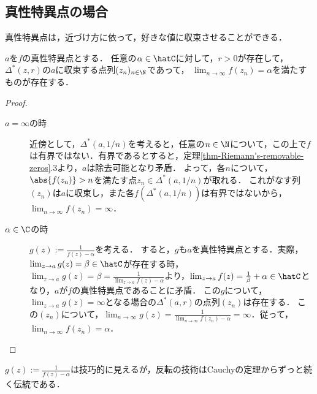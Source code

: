 \documentclass[uplatex, dvipdfmx]{jsreport}
\begin{document}
\subsection{真性特異点の場合}

\begin{screen}
    真性特異点は，近づけ方に依って，好きな値に収束させることができる．
\end{screen}

\begin{theorem}
    $a$を$f$の真性特異点とする．
    任意の$\alpha\in\hatC$に対して，$r>0$が存在して，
    $\Delta^*(z,r)$の$a$に収束する点列$(z_n)_{n\in\N}$であって，
    $\lim_{n\to\infty}f(z_n)=\alpha$を満たすものが存在する．
\end{theorem}
\begin{proof}
    \begin{description}
        \item[$a=\infty$の時] 
        近傍として，$\Delta^*(a,1/n)$を考えると，任意の$n\in\N$について，この上で$f$は有界ではない．有界であるとすると，定理\ref{thm-Riemann's-removable-zeros}.3より，$a$は除去可能となり矛盾．
        よって，各$n$について，$\abs{f(z_n)}>n$を満たす点$z_n\in\Delta^*(a,1/n)$が取れる．
        これがなす列$(z_n)$は$a$に収束し，また各$f(\Delta^*(a,1/n))$は有界ではないから，$\lim_{n\to\infty}f(z_n)=\infty$．
        \item[$\alpha\in\C$の時]
        $g(z):=\frac{1}{f(z)-\alpha}$を考える．
        すると，$g$も$a$を真性特異点とする．実際，$\lim_{z\to a}g(z)=\beta\in\hatC$が存在する時，$\lim_{z\to a}g(z)=\beta=\frac{1}{\lim_{z\to a}f(z)-\alpha}$より，$\lim_{z\to a}f(z)=\frac{1}{\beta}+\alpha\in\hatC$となり，$a$が$f$の真性特異点であることに矛盾．
        この$g$について，$\lim_{z\to a}g(z)=\infty$となる場合の$\Delta^*(a,r)$の点列$(z_n)$は存在する．
        この$(z_n)$について，$\lim_{n\to\infty}g(z)=\frac{1}{\lim_{n\to \infty}f(z_n)-\alpha}=\infty$．従って，$\lim_{n\to\infty}f(z_n)=\alpha$．
    \end{description}
\end{proof}
\begin{remarks}
    $g(z):=\frac{1}{f(z)-\alpha}$は技巧的に見えるが，反転の技術はCauchyの定理からずっと続く伝統である．
\end{remarks}
\end{document}
